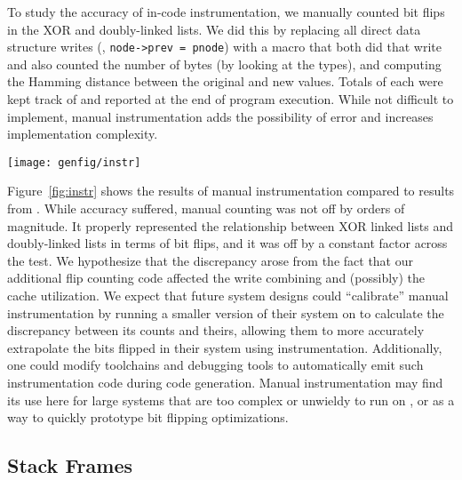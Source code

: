 To study the accuracy of in-code instrumentation, we
manually counted bit flips in the XOR and doubly-linked lists.
We did this by replacing all direct data structure writes (\eg, \texttt{node->prev =
	pnode}) with a macro that both did that write and also counted the number of bytes (by looking
at the types), and computing the Hamming distance between the original and new values. Totals of
each were kept track of and reported at the end of program execution. While not difficult to
implement, manual instrumentation adds the possibility of error and increases implementation
complexity.

\begin{SCfigure}
	\centering
	\texttt{[image: genfig/instr]}
	\caption[Instrumentation vs. simulation for bit flips]{Manual instrumentation for counting bit flips (instr) compared to
		full-system simulation (sim).}
	\label{fig:instr}
\end{SCfigure}


Figure~\ref{fig:instr} shows the results of manual instrumentation compared to
results from \gem. While accuracy suffered, manual counting was not off by
orders of magnitude. It properly represented the relationship between XOR
linked lists and doubly-linked lists in terms of bit flips, and it was off by a
constant factor across the test. We hypothesize that the discrepancy arose from the fact that our
additional flip counting code affected the write combining and (possibly) the cache
utilization. We expect that
future system designs could ``calibrate'' manual instrumentation by running
a smaller version of their system on \gem to calculate the discrepancy between
its counts and theirs, allowing them to more accurately extrapolate the bits
flipped
in their system using instrumentation. Additionally, one could modify
toolchains and debugging tools to automatically emit such instrumentation code
during code generation. Manual instrumentation may find its use here for large systems that are too
complex or unwieldy to run on \gem, or as a way to quickly prototype bit flipping optimizations.


\subsection{Stack Frames}

